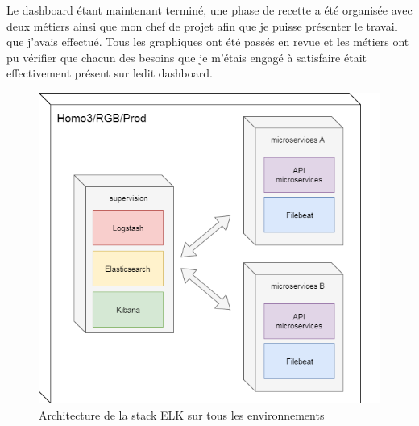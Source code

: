 	Le dashboard étant maintenant terminé, une phase de recette a été organisée avec deux métiers ainsi que mon chef de projet afin que je puisse présenter le travail que j'avais effectué. Tous les graphiques ont été passés en revue et les métiers ont pu vérifier que chacun des besoins que je m'étais engagé à satisfaire était effectivement présent sur ledit dashboard.

\begin{figure}[h!]
	\includegraphics[scale=0.5]{images/travailNeuflizeOBC/dashboard/elkDeploiement.png}
	\centering
	\caption{Architecture de la stack ELK sur tous les environnements}
	\label{elkDeploiement}
\end{figure}